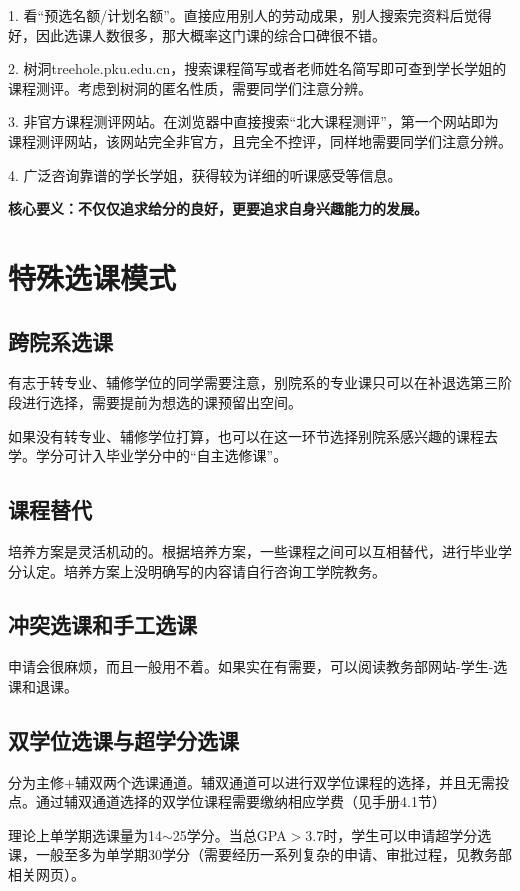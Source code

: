 \documentclass[11pt,oneside]{book}
\begin{document}
1. 看“预选名额/计划名额”。直接应用别人的劳动成果，别人搜索完资料后觉得好，因此选课人数很多，那大概率这门课的综合口碑很不错。

2. 树洞treehole.pku.edu.cn，搜索课程简写或者老师姓名简写即可查到学长学姐的课程测评。考虑到树洞的匿名性质，需要同学们注意分辨。

3. 非官方课程测评网站。在浏览器中直接搜索“北大课程测评”，第一个网站即为课程测评网站，该网站完全非官方，且完全不控评，同样地需要同学们注意分辨。

4. 广泛咨询靠谱的学长学姐，获得较为详细的听课感受等信息。

\textbf{核心要义：不仅仅追求给分的良好，更要追求自身兴趣能力的发展。}

\section{特殊选课模式}
\subsection{跨院系选课}
有志于转专业、辅修学位的同学需要注意，别院系的专业课只可以在补退选第三阶段进行选择，需要提前为想选的课预留出空间。

如果没有转专业、辅修学位打算，也可以在这一环节选择别院系感兴趣的课程去学。学分可计入毕业学分中的“自主选修课”。

\subsection{课程替代}
培养方案是灵活机动的。根据培养方案，一些课程之间可以互相替代，进行毕业学分认定。培养方案上没明确写的内容请自行咨询工学院教务。

\subsection{冲突选课和手工选课}
申请会很麻烦，而且一般用不着。如果实在有需要，可以阅读教务部网站-学生-选课和退课。

\subsection{双学位选课与超学分选课}
分为主修+辅双两个选课通道。辅双通道可以进行双学位课程的选择，并且无需投点。通过辅双通道选择的双学位课程需要缴纳相应学费（见手册4.1节）

理论上单学期选课量为14$\sim$25学分。当总GPA$>$3.7时，学生可以申请超学分选课，一般至多为单学期30学分（需要经历一系列复杂的申请、审批过程，见教务部相关网页）。
\end{document}
